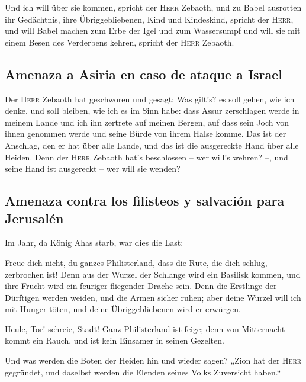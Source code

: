  Und ich will über sie kommen, spricht der \textsc{Herr}
Zebaoth, und zu Babel ausrotten ihr Gedächtnis, ihre Übriggebliebenen,
Kind und Kindeskind, spricht der \textsc{Herr},  und will
Babel machen zum Erbe der Igel und zum Wassersumpf und will sie mit
einem Besen des Verderbens kehren, spricht der \textsc{Herr} Zebaoth.

\hypertarget{amenaza-a-asiria-en-caso-de-ataque-a-israel}{%
\subsection{Amenaza a Asiria en caso de ataque a
Israel}\label{amenaza-a-asiria-en-caso-de-ataque-a-israel}}

 Der \textsc{Herr} Zebaoth hat geschworen und gesagt: Was
gilt's? es soll gehen, wie ich denke, und soll bleiben, wie ich es im
Sinn habe:  dass Assur zerschlagen werde in meinem Lande
und ich ihn zertrete auf meinen Bergen, auf dass sein Joch von ihnen
genommen werde und seine Bürde von ihrem Halse komme. 
Das ist der Anschlag, den er hat über alle Lande, und das ist die
ausgereckte Hand über alle Heiden.  Denn der
\textsc{Herr} Zebaoth hat's beschlossen -- wer will's wehren? --, und
seine Hand ist ausgereckt -- wer will sie wenden?

\hypertarget{amenaza-contra-los-filisteos-y-salvaciuxf3n-para-jerusaluxe9n}{%
\subsection{Amenaza contra los filisteos y salvación para
Jerusalén}\label{amenaza-contra-los-filisteos-y-salvaciuxf3n-para-jerusaluxe9n}}

 Im Jahr, da König Ahas starb, war dies die Last:

 Freue dich nicht, du ganzes Philisterland, dass die
Rute, die dich schlug, zerbrochen ist! Denn aus der Wurzel der Schlange
wird ein Basilisk kommen, und ihre Frucht wird ein feuriger fliegender
Drache sein.  Denn die Erstlinge der Dürftigen werden
weiden, und die Armen sicher ruhen; aber deine Wurzel will ich mit
Hunger töten, und deine Übriggebliebenen wird er erwürgen.

 Heule, Tor! schreie, Stadt! Ganz Philisterland ist
feige; denn von Mitternacht kommt ein Rauch, und ist kein Einsamer in
seinen Gezelten.

 Und was werden die Boten der Heiden hin und wieder
sagen? „Zion hat der \textsc{Herr} gegründet, und daselbst werden die
Elenden seines Volks Zuversicht haben.``

